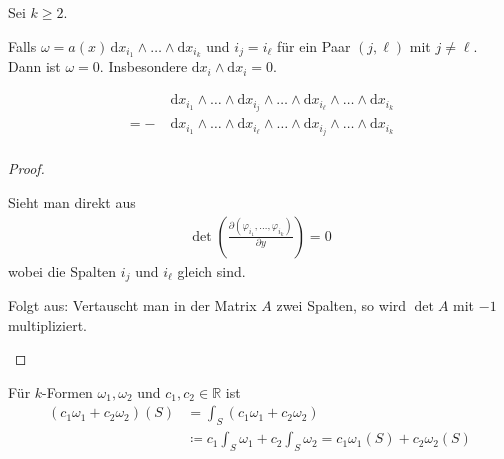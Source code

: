 \begin{notice}[Eigenschaften:] \label{thm:12.7}
  Sei $k \geq 2$.
  \begin{enum-arab}
    \item Falls $\omega = a(x) \, \mathrm{d}x_{i_1} \wedge \ldots \wedge \mathrm{d}x_{i_k}$ und $i_j = i_\ell$ für ein Paar $(j,\ell)$ mit $j \neq \ell$. Dann ist $\omega = 0$. Insbesondere $\mathrm{d}x_i \wedge \mathrm{d}x_i = 0$.
    
    \item
    \begin{align*}
      &\mathrm{d}x_{i_1} \wedge \ldots \wedge \mathrm{d}x_{i_j} \wedge \ldots \wedge \mathrm{d}x_{i_\ell} \wedge \ldots \wedge \mathrm{d}x_{i_k} \\
      = - \; &\mathrm{d}x_{i_1} \wedge \ldots \wedge \mathrm{d}x_{i_\ell} \wedge \ldots \wedge \mathrm{d}x_{i_j} \wedge \ldots \wedge \mathrm{d}x_{i_k} \\
    \end{align*}
  \end{enum-arab}
  
  \begin{proof}
    \begin{enum-arab}
      \item Sieht man direkt aus
      \begin{align*}
        \det \left( \frac{\partial (\varphi_{i_1} ,\ldots, \varphi_{i_k})}{\partial y} \right) = 0
      \end{align*}
      wobei die Spalten $i_j$ und $i_\ell$ gleich sind.
      
      \item Folgt aus: Vertauscht man in der Matrix $A$ zwei Spalten, so wird $\det A$ mit $-1$ multipliziert.
    \end{enum-arab}
  \end{proof}
\end{notice}

\begin{notice} \label{thm:12.8}
  Für $k$-Formen $\omega_1,\omega_2$ und $c_1, c_2 \in \mathbb{R}$ ist
  \begin{align*}
    (c_1 \omega_1 + c_2 \omega_2)(S)
    &= \int_S (c_1 \omega_1 + c_2 \omega_2) \\
    &\coloneq c_1 \int_S \omega_1 + c_2 \int_S \omega_2 = c_1 \omega_1(S) + c_2 \omega_2(S)
  \end{align*}
\end{notice}

